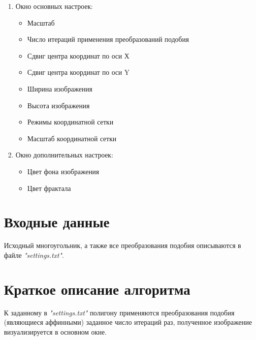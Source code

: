 \documentclass[a4paper,12pt,preview]{report} %
\begin{document}
	\begin{enumerate}
		\item Окно основных настроек:
		
		\begin{itemize}
			\item Масштаб
			\item Число итераций применения преобразований подобия
			\item Сдвиг центра координат по оси Х
			\item Сдвиг центра координат по оси Y
			\item Ширина изображения
			\item Высота изображения
			\item Режимы координатной сетки
			\item Масштаб координатной сетки
		\end{itemize}
		
		\item Окно дополнительных настроек:
		
		\begin{itemize}
			\item Цвет фона изображения
			\item Цвет фрактала
		\end{itemize}
		
	\end{enumerate}
	
	
	\section{Входные данные}
	Исходный многоугольник, а также все преобразования подобия описываются в файле \textit{"settings.txt"}.
	
	
	\section{Краткое описание алгоритма}
	К заданному в \textit{"settings.txt"} полигону применяются преобразования подобия (являющиеся аффинными) заданное число итераций раз, полученное изображение визуализируется в основном окне.  
	
	
	
	
\end{document}
